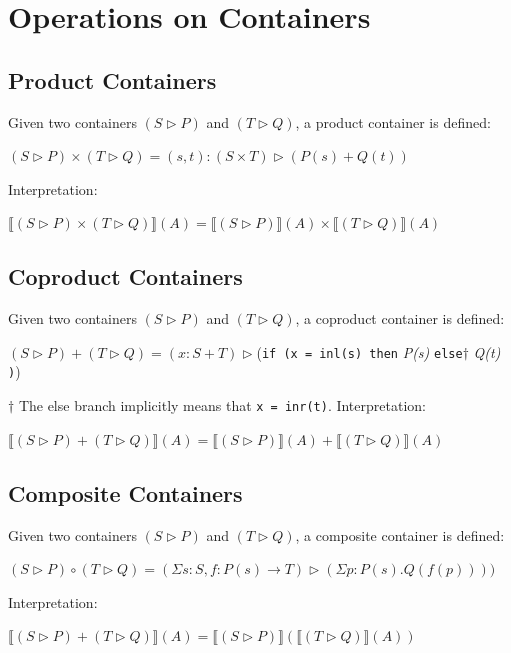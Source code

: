 \documentclass[12pt]{report}
\begin{document}
\section{Operations on Containers}
\subsection{Product Containers}
Given two containers $(S \rhd P)$ and $ (T \rhd Q)$, a product container is defined:
\begin{center}
$(S \rhd P) \times (T \rhd Q) = (s,t): (S \times T) \rhd (P(s) + Q(t))$
\end{center}
Interpretation:
\begin{center}
$\llbracket (S \rhd P) \times (T \rhd Q) \rrbracket (A)= \llbracket(S \rhd P) \rrbracket (A) \times \llbracket (T \rhd Q) \rrbracket (A)$
\end{center}

\subsection{Coproduct Containers}
Given two containers $(S \rhd P)$ and $ (T \rhd Q)$, a coproduct container is defined:
\begin{center}
$(S \rhd P) + (T \rhd Q) = (x:S + T) \rhd $(\texttt{if (x = inl(s) then} \textit{P(s)} \texttt{else}$\dagger$ \textit{Q(t)} \texttt{)})
\end{center}
$\dagger$ The else branch implicitly means that \texttt{x = inr(t)}.
Interpretation:
\begin{center}
$\llbracket (S \rhd P) + (T \rhd Q) \rrbracket (A)= \llbracket(S \rhd P) \rrbracket (A) + \llbracket (T \rhd Q) \rrbracket (A)$
\end{center}


\subsection{Composite Containers}
Given two containers $(S \rhd P)$ and $ (T \rhd Q)$, a composite container is defined:
\begin{center}
$(S \rhd P) \circ (T \rhd Q) = (\Sigma s:S,f:P(s) \to T) \rhd (\Sigma p:P(s).Q(f(p))))$
\end{center}
Interpretation:
\begin{center}
$\llbracket (S \rhd P) + (T \rhd Q) \rrbracket (A)= \llbracket(S \rhd P) \rrbracket (\llbracket (T \rhd Q) \rrbracket (A))$
\end{center}
\end{document}
